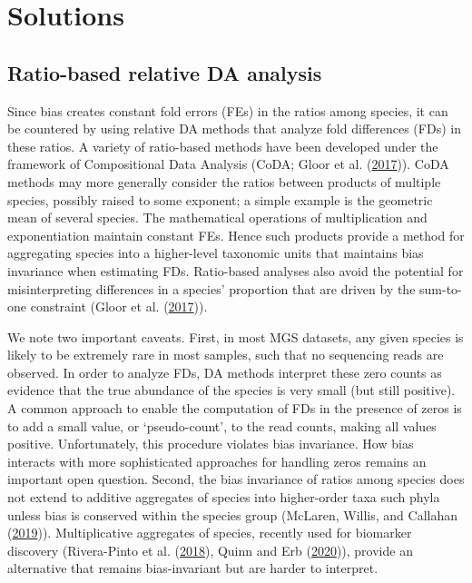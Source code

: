 \documentclass[
]{article}
\begin{document}
\hypertarget{solutions}{%
\section{Solutions}\label{solutions}}

\hypertarget{ratio-based-relative-da-analysis}{%
\subsection{Ratio-based relative DA analysis}\label{ratio-based-relative-da-analysis}}

Since bias creates constant fold errors (FEs) in the ratios among species, it can be countered by using relative DA methods that analyze fold differences (FDs) in these ratios.
A variety of ratio-based methods have been developed under the framework of Compositional Data Analysis (CoDA; Gloor et al. (\protect\hyperlink{ref-gloor2017micr}{2017})).
CoDA methods may more generally consider the ratios between products of multiple species, possibly raised to some exponent; a simple example is the geometric mean of several species.
The mathematical operations of multiplication and exponentiation maintain constant FEs.
Hence such products provide a method for aggregating species into a higher-level taxonomic units that maintains bias invariance when estimating FDs.
Ratio-based analyses also avoid the potential for misinterpreting differences in a species' proportion that are driven by the sum-to-one constraint (Gloor et al. (\protect\hyperlink{ref-gloor2017micr}{2017})).

We note two important caveats.
First, in most MGS datasets, any given species is likely to be extremely rare in most samples, such that no sequencing reads are observed.
In order to analyze FDs, DA methods interpret these zero counts as evidence that the true abundance of the species is very small (but still positive).
A common approach to enable the computation of FDs in the presence of zeros is to add a small value, or `pseudo-count', to the read counts, making all values positive.
Unfortunately, this procedure violates bias invariance.
How bias interacts with more sophisticated approaches for handling zeros remains an important open question.
Second, the bias invariance of ratios among species does not extend to additive aggregates of species into higher-order taxa such phyla unless bias is conserved within the species group (McLaren, Willis, and Callahan (\protect\hyperlink{ref-mclaren2019cons}{2019})).
Multiplicative aggregates of species, recently used for biomarker discovery (Rivera-Pinto et al. (\protect\hyperlink{ref-riverapinto2018bala}{2018}), Quinn and Erb (\protect\hyperlink{ref-quinn2020inte}{2020})), provide an alternative that remains bias-invariant but are harder to interpret.
\end{document}
